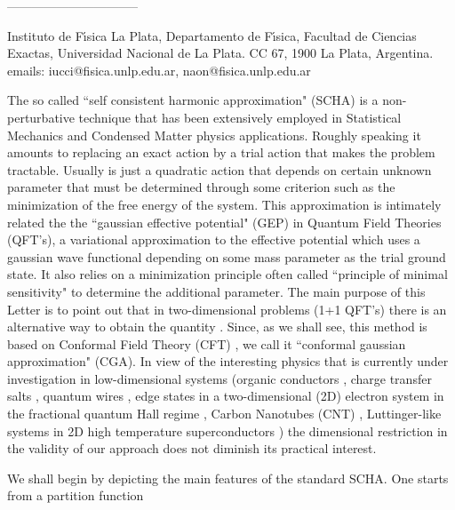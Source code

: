 \documentclass[a4paper,12pt]{article}
\begin{document}
\noindent --------------------------------


\noindent {}\coordHE{} {\footnotesize Instituto de F\'{\i}sica La Plata,
Departamento de F\'{\i}sica, Facultad de Ciencias Exactas,
Universidad Nacional de La Plata.  CC 67, 1900 La Plata,
Argentina.\\emails: iucci@fisica.unlp.edu.ar,
naon@fisica.unlp.edu.ar}


\newpage

The so called ``self consistent harmonic approximation" (SCHA) is
a non-perturbative technique that has been extensively employed in
Statistical Mechanics \cite{Saito}\cite{Fisher-Zwerger} and
Condensed Matter physics
\cite{Gogolin}\cite{Egger}\cite{Xu}\cite{Iucci} applications.
Roughly speaking it amounts to replacing an exact action
\coordHE{} by a trial action \coordHE{} that makes
the problem tractable. Usually \coordHE{} is just a
quadratic action that depends on certain unknown parameter
\myHighlight{$\Omega$}\coordHE{} that must be determined through some criterion such as
the minimization of the free energy of the system. This
approximation is intimately related the the ``gaussian effective
potential" (GEP) \cite{Stevenson}\cite{Ingermanson} in Quantum
Field Theories (QFT's), a variational approximation to the
effective potential which uses a gaussian wave functional
depending on some mass parameter as the trial ground state. It
also relies on a minimization principle often called ``principle
of minimal sensitivity" \cite{minimal} to determine the additional
parameter. The main purpose of this Letter is to point out that in
two-dimensional problems (1+1 QFT's) there is an alternative way
to obtain the quantity \myHighlight{$\Omega$}\coordHE{}. Since, as we shall see, this
method is based on Conformal Field Theory (CFT) \cite{CFT}, we
call it ``conformal gaussian approximation" (CGA). In view of the
interesting physics that is currently under investigation in
low-dimensional systems (organic conductors \cite{organic
conductors}, charge transfer salts \cite{salts}, quantum wires
\cite{quantum wires}, edge states in a two-dimensional (2D)
electron system in the fractional quantum Hall regime \cite{FQH},
Carbon Nanotubes (CNT) \cite{CNT}, Luttinger-like systems in 2D
high temperature superconductors \cite{Orgad}) the dimensional
restriction in the validity of our approach does not diminish its
practical interest.

We shall begin by depicting the main features of the standard SCHA. One starts from a
partition function
\end{document}
